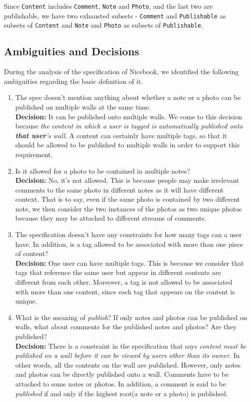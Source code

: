 \documentclass[titlepage]{article}
\begin{document}
Since \texttt{Content} includes \texttt{Comment}, \texttt{Note} and \texttt{Photo}, and the last two are publishable, we have two exhausted subsets - \texttt{Comment} and \texttt{Publishable} as subsets of \texttt{Content} and \texttt{Note} and \texttt{Photo} as  subsets of \texttt{Publishable}.

\subsection{Ambiguities and Decisions}
\label{Ambiguities}
During the analysis of the specification of Nicebook, we identified the following ambiguities regarding the basic definition of it.

\begin{enumerate}
    \item The spec doesn't mention anything about whether a note or a photo can be published on multiple walls at the same time.\\
    \textbf{Decision:} It can be published onto multiple walls. We come to this decision because \textit{the content in which a user is tagged is automatically published onto \textbf{that user}’s wall}. A content can certainly have multiple tags, so that it should be allowed to be published to multiple walls in order to support this requirement.
    
    \item Is it allowed for a photo to be contained in multiple notes?\\
    \textbf{Decision:} No, it's not allowed. This is because people may make irrelevant comments to the same photo in different notes as it will have different context. That is to say, even if the same photo is contained by two different note, we then consider the two instances of the photos as two unique photos because they may be attached to different streams of comments.
    
    \item The specification doesn't have any constraints for how many tags can a user have. In addition, is a tag allowed to be associated with more than one piece of content?\\
    \textbf{Decision:} One user can have multiple tags. This is because we consider that tags that reference the same user but appear in different contents are different from each other. Moreover, a tag is not allowed to be associated with more than one content, since each tag that appears on the content is unique.
    
    \item What is the meaning of \textit{publish}? If only notes and photos can be published on walls, what about comments for the published notes and photos? Are they published?\\
    \textbf{Decision:} There is a constraint in the specification that says \textit{content must be published on a wall before it can be viewed by users other than its owner}. In other words, all the contents on the wall are published. However, only notes and photos can be directly published onto a wall. Comments have to be attached to some notes or photos. In addition, a comment is said to be \textit{published} if and only if the highest root(a note or a photo) is published.
    

\end{enumerate}
\end{document}
